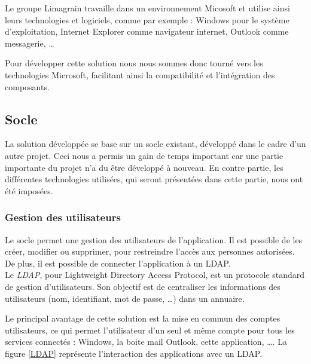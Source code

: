 Le groupe Limagrain travaille dans un environnement Micosoft et utilise ainsi leurs technologies et logiciels, comme par exemple : Windows pour le système d'exploitation, Internet Explorer comme navigateur internet, Outlook comme messagerie, \ldots

Pour développer cette solution nous nous sommes donc tourné vers les technologies Microsoft, facilitant ainsi la compatibilité et l'intégration des composants.


\subsection{Socle}

La solution développée se base sur un socle existant, développé dans le cadre d'un autre projet. Ceci nous a permis un gain de temps important car une partie importante du projet n'a du être développé à nouveau. En contre partie, les différentes technologies utilisées, qui seront présentées dans cette partie, nous ont été imposées.


\subsubsection{Gestion des utilisateurs}

Le socle permet une gestion des utilisateurs de l'application. Il est possible de les créer, modifier ou supprimer, pour restreindre l'accès aux personnes autorisées. De plus, il est possible de connecter l'application à un LDAP.
\\

Le \textit{LDAP}, pour Lightweight Directory Access Protocol, est un protocole standard de gestion d'utilisateurs. Son objectif est de centraliser les informations des utilisateurs (nom, identifiant, mot de passe, \ldots) dans un annuaire.

Le principal avantage de cette solution est la mise en commun des comptes utilisateurs, ce qui permet l'utilisateur d'un seul et même compte pour tous les services connectés : Windows, la boite mail Outlook, cette application, \ldots. La figure \ref{LDAP} représente l'interaction des applications avec un LDAP.

